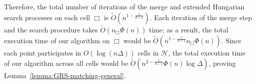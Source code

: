 \documentclass[11pt,onecolumn]{article}
\def\mcH{{\mathcal{H}}}
\newcommand{\cell}{\Box}
\begin{document}
Therefore, the total number of iterations of the merge and extended Hungarian search processes on each cell $\cell$ is $\tilde{O}(n^{1-\frac{1}{d+2}})$. Each iteration of the merge step and the search procedure takes $\tilde{O}(n_\cell\Phi(n))$ time; as a result, the total execution time of our algorithm on $\cell$ would be $\tilde{O}(n^{1-\frac{1}{d+2}}n_\cell\Phi(n))$. Since each point participates in $O(\log(n\Delta))$ cells in $\mcH$, the total execution time of our algorithm across all cells would be $\tilde{O}(n^{2-\frac{1}{d+2}}\Phi(n)\log\Delta)$, proving Lemma~\ref{lemma:GRS-matching-general}.

%

%
%


%
%
%
%
%
%
%
%
%
%
%
%
%
%

%
\end{document}

